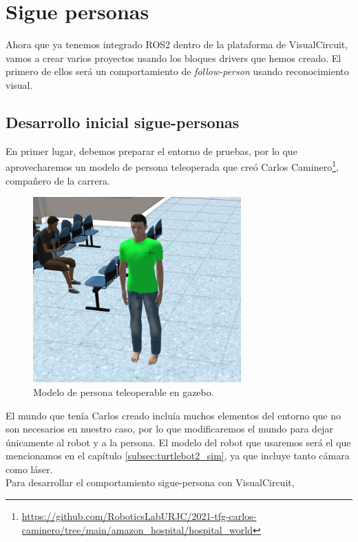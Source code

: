 \chapter{Sigue personas}
\label{cap:capitulo5}
Ahora que ya tenemos integrado ROS2 dentro de la plataforma de VisualCircuit, vamos a crear varios proyectos usando los bloques drivers que hemos creado. El primero de ellos será un comportamiento de \textit{follow-person} usando reconocimiento visual.

\section{Desarrollo inicial sigue-personas}
\label{sec:VC_intro}

En primer lugar, debemos preparar el entorno de pruebas, por lo que aprovecharemos un modelo de persona teleoperada que creó Carlos Caminero\footnote{\url{https://github.com/RoboticsLabURJC/2021-tfg-carlos-caminero/tree/main/amazon_hospital/hospital_world}}, compañero de la carrera.

\begin{figure} [H]
    \begin{center}
        \includegraphics[width=8cm]{figs/c5/elman.png}
    \end{center}
    \caption[Modelo de persona en gazebo]{Modelo de persona teleoperable en gazebo.}
    \label{fig:teleop_person}
\end{figure}

El mundo que tenía Carlos creado incluía muchos elementos del entorno que no son necesarios en nuestro caso, por lo que modificaremos el mundo para dejar únicamente al robot y a la persona. El modelo del robot que usaremos será el que mencionamos en el capítulo \ref{subsec:turtlebot2_sim}, ya que incluye tanto cámara como láser.\\

Para desarrollar el comportamiento sigue-persona con VisualCircuit, 





















